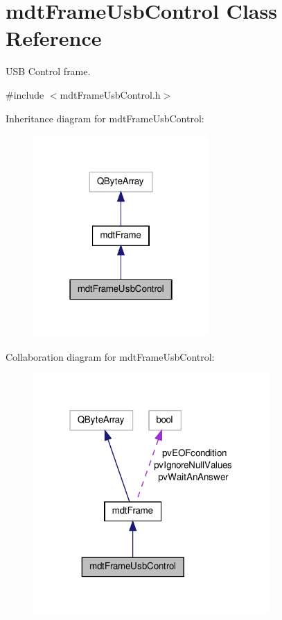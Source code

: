 \hypertarget{classmdt_frame_usb_control}{\section{mdt\-Frame\-Usb\-Control Class Reference}
\label{classmdt_frame_usb_control}
}


U\-S\-B Control frame.  




{\ttfamily \#include $<$mdt\-Frame\-Usb\-Control.\-h$>$}



Inheritance diagram for mdt\-Frame\-Usb\-Control\-:\nopagebreak
\begin{figure}[H]
\begin{center}
\leavevmode
\includegraphics[width=190pt]{classmdt_frame_usb_control__inherit__graph}
\end{center}
\end{figure}


Collaboration diagram for mdt\-Frame\-Usb\-Control\-:\nopagebreak
\begin{figure}[H]
\begin{center}
\leavevmode
\includegraphics[width=256pt]{classmdt_frame_usb_control__coll__graph}
\end{center}
\end{figure}
